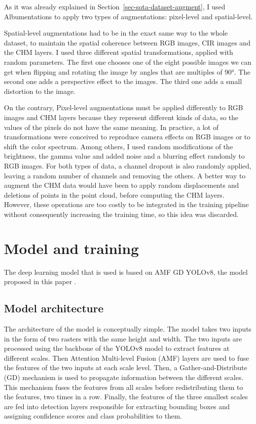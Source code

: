 \documentclass[
  letterpaper,
  DIV=11,
  numbers=noendperiod]{scrartcl}
\begin{document}
As it was already explained in Section~\ref{sec-sota-dataset-augment}, I
used Albumentations \autocite{albumentations} to apply two types of
augmentations: pixel-level and spatial-level.

Spatial-level augmentations had to be in the exact same way to the whole
dataset, to maintain the spatial coherence between RGB images, CIR
images and the CHM layers. I used three different spatial
transformations, applied with random parameters. The first one chooses
one of the eight possible images we can get when flipping and rotating
the image by angles that are multiples of 90°. The second one adds a
perspective effect to the images. The third one adds a small distortion
to the image.

On the contrary, Pixel-level augmentations must be applied differently
to RGB images and CHM layers because they represent different kinds of
data, so the values of the pixels do not have the same meaning. In
practice, a lot of transformations were conceived to reproduce camera
effects on RGB images or to shift the color spectrum. Among others, I
used random modifications of the brightness, the gamma value and added
noise and a blurring effect randomly to RGB images. For both types of
data, a channel dropout is also randomly applied, leaving a random
number of channels and removing the others. A better way to augment the
CHM data would have been to apply random displacements and deletions of
points in the point cloud, before computing the CHM layers. However,
these operations are too costly to be integrated in the training
pipeline without consequently increasing the training time, so this idea
was discarded.

\section{Model and training}\label{model-and-training}

The deep learning model that is used is based on AMF GD YOLOv8, the
model proposed in this paper \autocite{amf_gd_yolov8}.

\subsection{Model architecture}\label{model-architecture}

The architecture of the model is conceptually simple. The model takes
two inputs in the form of two rasters with the same height and width.
The two inputs are processed using the backbone of the YOLOv8 model
\autocite{yolo} to extract features at different scales. Then Attention
Multi-level Fusion (AMF) layers are used to fuse the features of the two
inputs at each scale level. Then, a Gather-and-Distribute (GD) mechanism
is used to propagate information between the different scales. This
mechanism fuses the features from all scales before redistributing them
to the features, two times in a row. Finally, the features of the three
smallest scales are fed into detection layers responsible for extracting
bounding boxes and assigning confidence scores and class probabilities
to them.
\end{document}
